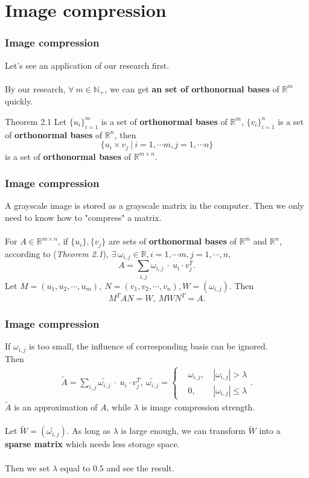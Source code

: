 \documentclass{beamer}
\begin{document}
\section{Image compression}
\begin{frame}
    \frametitle{Image compression}
    Let's see an application of our research first.\\ \ \\
    By our research, $\forall\ m \in \mathbb{N}_{+}$, we can get \textbf{an set of orthonormal bases} of $\mathbb{R}^{m}$ quickly.
    \begin{block}{Theorem 2.1}
        Let $\{u_{i}\}_{i=1}^{m}$ is a set of \textbf{orthonormal bases} of $\mathbb{R}^{m}$, $\{v_{i}\}_{i=1}^{n}$ is a set of \textbf{orthonormal bases} of $\mathbb{R}^{n}$, then
        $$\{u_{i}\times v_{j}\ |\ i = 1,\cdots m, j=1,\cdots n\}$$
        is a set of \textbf{orthonormal bases} of $\mathbb{R}^{m\times n}$.
    \end{block}
\end{frame}
\begin{frame}
    \frametitle{Image compression}
    A grayscale image is stored as a grayscale matrix in the computer. Then we only need to know how to "{\color{blue}compress}" a matrix.\\ \ \\
    For $A \in \mathbb{R}^{m\times n}$, if $\{u_{i}\},\{v_{j}\}$ are sets of \textbf{orthonormal bases} of $\mathbb{R}^{m}$ and $\mathbb{R}^{n}$, according to (\textit{Theorem 2.1}),
    $\exists\ \omega_{i,j}\in\mathbb{R}, i = 1, \cdots m, j = 1, \cdots, n,$
    $$	A = \sum_{i,j}\omega_{i,j}\ \cdot \ u_{i} \cdot v_{j}^{T}.$$
    Let $M = (u_{1},u_{2},\cdots,u_{m}),\ N = (v_{1},v_{2},\cdots,v_{n}), W = (\omega_{i,j}).$ Then
    $$M^{T}AN =W,\ MWN^{T} = A.$$
\end{frame}
\begin{frame}
    \frametitle{Image compression}
    {\color{red}If $\omega_{i,j}$ is too small, the influence of  corresponding basis can be ignored.} \\Then
    \begin{align*}
        \widetilde{A} = \sum_{i,j}\widetilde{\omega_{i,j}}\ \cdot \ u_{i} \cdot v_{j}^{T},\ \widetilde{\omega_{i,j}} = \left\{
        \begin{aligned}
             & \omega_{i,j}, & \ |\omega_{i,j}| > \lambda    \\
             & 0,            & \ |\omega_{i,j}| \leq \lambda
        \end{aligned}
        \right..
    \end{align*}
    $\widetilde{A}$ is an approximation of $A$, while $\lambda$ is image compression strength.\\ \ \\
    Let $\widetilde{W} = (\widetilde{\omega_{i,j}}).$ As long as $\lambda$ is large enough, we can transform $\widetilde{W}$ into a \textbf{sparse matrix} which needs less storage space.\\ \ \\
    {\color{blue}Then we set $\lambda$ equal to $0.5$ and see the result.}
\end{frame}
\end{document}
